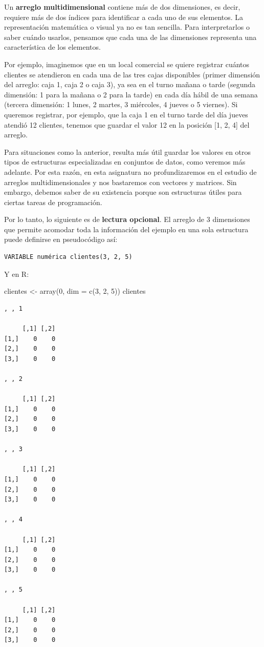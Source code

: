 \documentclass[
]{book}
\newenvironment{Shaded}{\begin{snugshade}}{\end{snugshade}}
\newcommand{\AttributeTok}[1]{\textcolor[rgb]{0.77,0.63,0.00}{#1}}
\newcommand{\DecValTok}[1]{\textcolor[rgb]{0.00,0.00,0.81}{#1}}
\newcommand{\FunctionTok}[1]{\textcolor[rgb]{0.00,0.00,0.00}{#1}}
\newcommand{\NormalTok}[1]{#1}
\newcommand{\OtherTok}[1]{\textcolor[rgb]{0.56,0.35,0.01}{#1}}
\begin{document}
Un \textbf{arreglo multidimensional} contiene más de dos dimensiones, es decir, requiere más de dos índices para identificar a cada uno de sus elementos. La representación matemática o visual ya no es tan sencilla. Para interpretarlos o saber cuándo usarlos, pensamos que cada una de las dimensiones representa una característica de los elementos.

Por ejemplo, imaginemos que en un local comercial se quiere registrar cuántos clientes se atendieron en cada una de las tres cajas disponibles (primer dimensión del arreglo: caja 1, caja 2 o caja 3), ya sea en el turno mañana o tarde (segunda dimensión: 1 para la mañana o 2 para la tarde) en cada día hábil de una semana (tercera dimensión: 1 lunes, 2 martes, 3 miércoles, 4 jueves o 5 viernes). Si queremos registrar, por ejemplo, que la caja 1 en el turno tarde del día jueves atendió 12 clientes, tenemos que guardar el valor 12 en la posición {[}1, 2, 4{]} del arreglo.

Para situaciones como la anterior, resulta más útil guardar los valores en otros tipos de estructuras especializadas en conjuntos de datos, como veremos más adelante. Por esta razón, en esta asignatura no profundizaremos en el estudio de arreglos multidimensionales y nos bastaremos con vectores y matrices. Sin embargo, debemos saber de su existencia porque son estructuras útiles para ciertas tareas de programación.

Por lo tanto, lo siguiente es de \textbf{lectura opcional}. El arreglo de 3 dimensiones que permite acomodar toda la información del ejemplo en una sola estructura puede definirse en pseudocódigo así:

\begin{verbatim}
VARIABLE numérica clientes(3, 2, 5)
\end{verbatim}

Y en R:

\begin{Shaded}
\begin{Highlighting}[]
\NormalTok{clientes }\OtherTok{\textless{}{-}} \FunctionTok{array}\NormalTok{(}\DecValTok{0}\NormalTok{, }\AttributeTok{dim =} \FunctionTok{c}\NormalTok{(}\DecValTok{3}\NormalTok{, }\DecValTok{2}\NormalTok{, }\DecValTok{5}\NormalTok{))}
\NormalTok{clientes}
\end{Highlighting}
\end{Shaded}

\begin{verbatim}
, , 1

     [,1] [,2]
[1,]    0    0
[2,]    0    0
[3,]    0    0

, , 2

     [,1] [,2]
[1,]    0    0
[2,]    0    0
[3,]    0    0

, , 3

     [,1] [,2]
[1,]    0    0
[2,]    0    0
[3,]    0    0

, , 4

     [,1] [,2]
[1,]    0    0
[2,]    0    0
[3,]    0    0

, , 5

     [,1] [,2]
[1,]    0    0
[2,]    0    0
[3,]    0    0
\end{verbatim}
\end{document}
